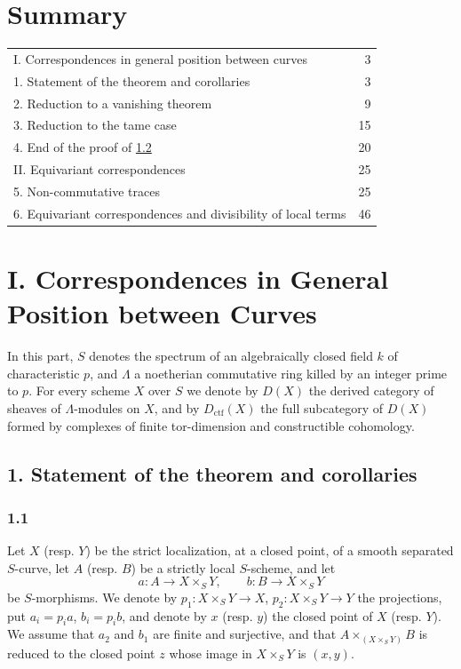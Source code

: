 \documentclass[11pt]{article}
\providecommand{\ctf}{\mathrm{ctf}}
\begin{document}
\section*{Summary}
\begin{tabular}{@{}p{}r@{}}
I. Correspondences in general position between curves & 3\\
1. Statement of the theorem and corollaries & 3\\
2. Reduction to a vanishing theorem & 9\\
3. Reduction to the tame case & 15\\
4. End of the proof of \hyperref[sga5:IIIB:theorem:1.2]{1.2} & 20\\
II. Equivariant correspondences & 25\\
5. Non-commutative traces & 25\\
6. Equivariant correspondences and divisibility of local terms & 46
\end{tabular}

\section*{I. Correspondences in General Position between Curves}

In this part, $S$ denotes the spectrum of an algebraically closed field $k$ of characteristic $p$, and $\Lambda$ a noetherian commutative ring killed by an integer prime to $p$. For every scheme $X$ over $S$ we denote by $D(X)$ the derived category of sheaves of $\Lambda$-modules on $X$, and by $D_{\ctf}(X)$ the full subcategory of $D(X)$ formed by complexes of finite tor-dimension and constructible cohomology.

\subsection*{1. Statement of the theorem and corollaries}\label{sga5:IIIB:subsection:1}

\subsubsection*{1.1}\label{sga5:IIIB:subsubsection:1.1}
Let $X$ (resp. $Y$) be the strict localization, at a closed point, of a smooth separated $S$-curve, let $A$ (resp. $B$) be a strictly local $S$-scheme, and let
\[
a:A\longrightarrow X\times_S Y,
\qquad
b:B\longrightarrow X\times_S Y
\]
be $S$-morphisms. We denote by $p_1:X\times_S Y\to X$, $p_2:X\times_S Y\to Y$ the projections, put $a_i=p_i a$, $b_i=p_i b$, and denote by $x$ (resp. $y$) the closed point of $X$ (resp. $Y$). We assume that $a_2$ and $b_1$ are finite and surjective, and that $A\times_{(X\times_S Y)}B$ is reduced to the closed point $z$ whose image in $X\times_S Y$ is $(x,y)$.
\end{document}
